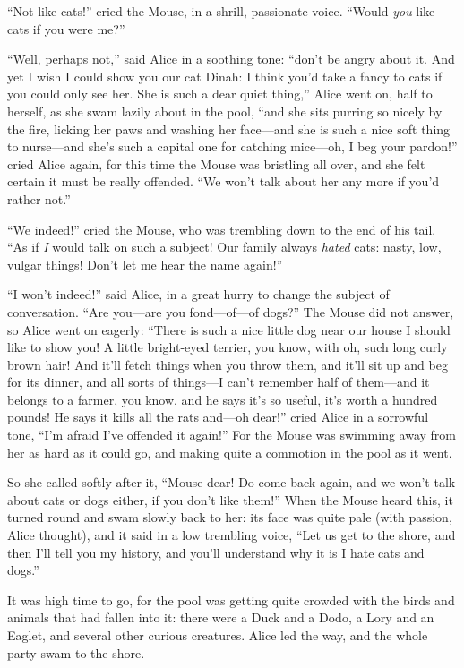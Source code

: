 \documentclass[11pt,openany,oneside]{book}
\begin{document}
“Not like cats!” cried the Mouse, in a shrill, passionate voice. “Would {\em you\/} like cats if you were me?” 

“Well, perhaps not,” said Alice in a soothing tone: “don’t be angry about it. And yet I wish I could show you our cat Dinah: I think you’d take a fancy to cats if you could only see her. She is such a dear quiet thing,” Alice went on, half to herself, as she swam lazily about in the pool, “and she sits purring so nicely by the fire, licking her paws and washing her face—and she is such a nice soft thing to nurse—and she’s such a capital one for catching mice—oh, I beg your pardon!” cried Alice again, for this time the Mouse was bristling all over, and she felt certain it must be really offended. “We won’t talk about her any more if you’d rather not.” 

“We indeed!” cried the Mouse, who was trembling down to the end of his tail. “As if {\em I\/} would talk on such a subject! Our family always {\em hated\/} cats: nasty, low, vulgar things! Don’t let me hear the name again!” 

“I won’t indeed!” said Alice, in a great hurry to change the subject of conversation. “Are you—are you fond—of—of dogs?” The Mouse did not answer, so Alice went on eagerly: “There is such a nice little dog near our house I should like to show you! A little bright-eyed terrier, you know, with oh, such long curly brown hair! And it’ll fetch things when you throw them, and it’ll sit up and beg for its dinner, and all sorts of things—I can’t remember half of them—and it belongs to a farmer, you know, and he says it’s so useful, it’s worth a hundred pounds! He says it kills all the rats and—oh dear!” cried Alice in a sorrowful tone, “I’m afraid I’ve offended it again!” For the Mouse was swimming away from her as hard as it could go, and making quite a commotion in the pool as it went. 

So she called softly after it, “Mouse dear! Do come back again, and we won’t talk about cats or dogs either, if you don’t like them!” When the Mouse heard this, it turned round and swam slowly back to her: its face was quite pale (with passion, Alice thought), and it said in a low trembling voice, “Let us get to the shore, and then I’ll tell you my history, and you’ll understand why it is I hate cats and dogs.” 

It was high time to go, for the pool was getting quite crowded with the birds and animals that had fallen into it: there were a Duck and a Dodo, a Lory and an Eaglet, and several other curious creatures. Alice led the way, and the whole party swam to the shore. 
\end{document}
